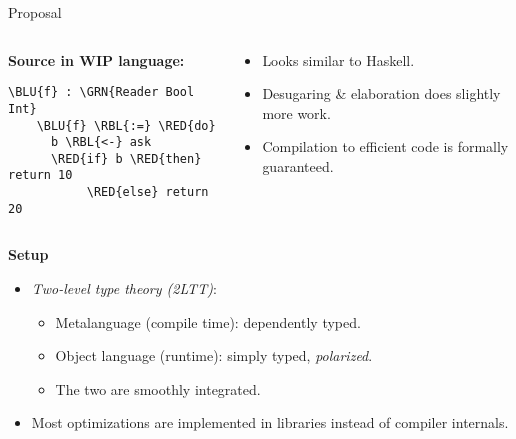 \documentclass[dvipsnames,aspectratio=169]{beamer}
\theoremstyle{remark}
\newcommand{\RED}[1]{{\color{BrickRed} #1}}
\newcommand{\GRN}[1]{{\color{OliveGreen} #1}}
\newcommand{\RBL}[1]{{\color{RoyalBlue} #1}}
\newcommand{\BLU}[1]{{\color{Blue} #1}}
\begin{document}
\begin{frame}[fragile]{Proposal}

\begin{columns}
\begin{column}{0.3\textwidth}
\textbf{Source in WIP language:}
\begin{Verbatim}[commandchars=\\\{\}]
    \BLU{f} : \GRN{Reader Bool Int}
    \BLU{f} \RBL{:=} \RED{do}
      b \RBL{<-} ask
      \RED{if} b \RED{then} return 10
           \RED{else} return 20
\end{Verbatim}

\end{column}
\begin{column}{0.6\textwidth}
\begin{itemize}
\item Looks similar to Haskell.
\item Desugaring \& elaboration does slightly more work.
\item Compilation to efficient code is formally guaranteed.
\end{itemize}
\end{column}
\end{columns}
\vspace{1em}
\pause

\begin{block}{}
\textbf{Setup}
\begin{itemize}
\item \emph{Two-level type theory (2LTT)}:
  \begin{itemize}
    \item Metalanguage (compile time): dependently typed.
    \item Object language (runtime): simply typed, \emph{polarized}.
    \item The two are smoothly integrated.
  \end{itemize}
\item Most optimizations are implemented in libraries instead of compiler internals.
\end{itemize}
\end{block}

\end{frame}
\end{document}
